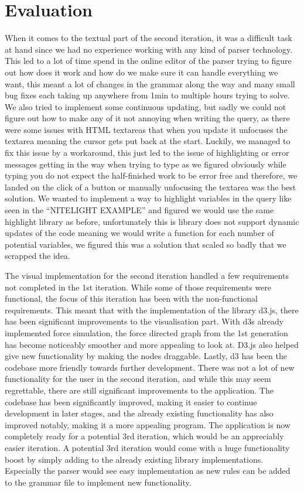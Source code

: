 \section{Evaluation}
\label{chap:second-eval}
When it comes to the textual part of the second iteration, it was a difficult task at hand since we had no experience working with any kind of parser technology. This led to a lot of time spend in the online editor of the parser trying to figure out how does it work and how do we make sure it can handle everything we want, this meant a lot of changes in the grammar along the way and many small bug fixes each taking up anywhere from 1min to multiple hours trying to solve. We also tried to implement some continuous updating, but sadly we could not figure out how to make any of it not annoying when writing the query, as there were some issues with HTML textareas that when you update it unfocuses the textarea meaning the cursor gets put back at the start. Luckily, we managed to fix this issue by a workaround, this just led to the issue of highlighting or error messages getting in the way when trying to type as we figured obviously while typing you do not expect the half-finished work to be error free and therefore, we landed on the click of a button or manually unfocusing the textarea was the best solution. We wanted to implement a way to highlight variables in the query like seen in the “NITELIGHT EXAMPLE'' and figured we would use the same highlight library as before, unfortunately this is library does not support dynamic updates of the code meaning we would write a function for each number of potential variables, we figured this was a solution that scaled so badly that we scrapped the idea.

\bigskip
The visual implementation for the second iteration handled a few requirements not completed in the 1st iteration. While some of those requirements were functional, the focus of this iteration has been with the non-functional requirements. This meant that with the implementation of the library d3.js, there has been significant improvements to the visualisation part. With d3s already implemented force simulation, the force directed graph from the 1st generation has become noticeably smoother and more appealing to look at. D3.js also helped give new functionality by making the nodes draggable. Lastly, d3 has been the codebase more friendly towards further development.
\bigskip
There was not a lot of new functionality for the user in the second iteration, and while this may seem regrettable, there are still significant improvements to the application. The codebase has been significantly improved, making it easier to continue development in later stages, and the already existing functionality has also improved notably, making it a more appealing program. The application is now completely ready for a potential 3rd iteration, which would be an appreciably easier iteration. A potential 3rd iteration would come with a huge functionality boost by simply adding to the already existing library implementations. Especially the parser would see easy implementation as new rules can be added to the grammar file to implement new functionality.